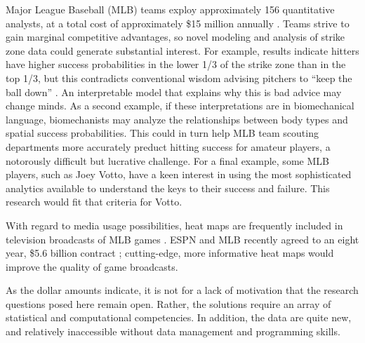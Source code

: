 \documentclass{article}
\begin{document}
Major League Baseball (MLB\textsuperscript{\textregistered}) teams exploy approximately 156 quantitative analysts, at a total cost of approximately \$15 million annually \citep{Lindbergh2016}. Teams strive to gain marginal competitive advantages, so novel modeling and analysis of strike zone data could generate substantial interest. For example, results indicate hitters have higher success probabilities in the lower 1/3 of the strike zone than in the top 1/3, but this contradicts conventional wisdom advising pitchers to ``keep the ball down'' \citep{Stallings2003}. An interpretable model that explains why this is bad advice may change minds. As a second example, if these interpretations are in biomechanical language, biomechanists may analyze the relationships between body types and spatial success probabilities. This could in turn help MLB\textsuperscript{\textregistered} team scouting departments more accurately preduct hitting success for amateur players, a notorously difficult but lucrative challenge. For a final example, some MLB\textsuperscript{\textregistered} players, such as Joey Votto, have a keen interest in using the most sophisticated analytics available to understand the keys to their success and failure\citep{Daugherty2015}. This research would fit that criteria for Votto.

With regard to media usage possibilities, heat maps are frequently included in television broadcasts of MLB\textsuperscript{\textregistered} games \citep{Cross2015}. ESPN\textsuperscript{\textregistered} and MLB\textsuperscript{\textregistered} recently agreed to an eight year, \$5.6 billion contract \citep{Newman2012}; cutting-edge, more informative heat maps would improve the quality of game broadcasts.

As the dollar amounts indicate, it is not for a lack of motivation that the research questions posed here remain open. Rather, the solutions require an array of statistical and computational competencies. In addition, the data are quite new, and relatively inaccessible without data management and programming skills.

\end{document}
